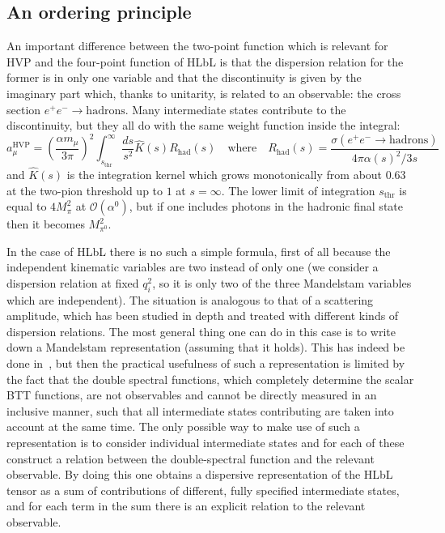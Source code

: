 \documentclass[epj]{webofc}
\renewcommand{\O}{\mathcal{O}}
\newcommand{\<}{\langle}
\renewcommand{\>}{\rangle}
\begin{document}
\subsection{An ordering principle}\label{Order}
An important difference between the two-point function which is relevant
for HVP and the four-point function of HLbL is that the dispersion relation
for the former is in only one variable and that the discontinuity is given
by the imaginary part which, thanks to unitarity, is related to an
observable: the cross section $e^+ e^- \to \mbox{hadrons}$. Many
intermediate states contribute to the discontinuity, but they all
do with the same weight function inside the integral:
\begin{equation}
a_\mu^\mathrm{HVP} = \left(\frac{\alpha m_\mu}{3 \pi}\right)^2
\int_{s_\mathrm{thr}}^\infty \frac{ds}{s^2} \hat{K}(s) R_\mathrm{had}(s)
\quad \mbox{where}\quad 
R_\mathrm{had}(s) = \frac{\sigma(e^+ e^- \to \mbox{hadrons})}{ 4 \pi \alpha(s)^2/3s}
\end{equation}
and $\hat K(s)$ is the integration kernel which grows monotonically from
about $0.63$ at the two-pion threshold up to $1$ at $s=\infty$. The lower
limit of integration $s_\mathrm{thr}$ is equal to $4 M_\pi^2$ at
$\O(\alpha^0)$, but if one includes photons in the hadronic final state
then it becomes $M_{\pi^0}^2$.

In the case of HLbL there is no such a simple formula, first of all because
the independent kinematic variables are two instead of only one (we
consider a dispersion relation at fixed $q_i^2$, so it is only two of the
three Mandelstam variables which are independent). The situation is
analogous to that of a scattering amplitude, which has been studied in
depth and treated with different kinds of dispersion relations. The most
general thing one can do in this case is to write down a Mandelstam
representation (assuming that it holds). This has indeed be done
in~\cite{Colangelo:2015ama}, but then the practical usefulness of such a
representation is limited by the fact that the double spectral functions,
which completely determine the scalar BTT functions, are not observables
and cannot be directly measured in an inclusive manner, such that all
intermediate states contributing are taken into account at the same
time. The only possible way to make use of such a representation is to
consider individual intermediate states and for each of these construct a
relation between the double-spectral function and the relevant
observable. By doing this one obtains a dispersive representation of the
HLbL tensor as a sum of contributions of different, fully specified
intermediate states, and for each term in the sum there is an explicit
relation to the relevant observable.
\end{document}
